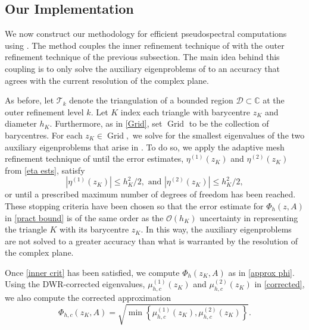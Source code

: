 
\subsection{Our Implementation}

We now construct our methodology for efficient pseudospectral computations using . The method couples the inner refinement technique of  with the outer refinement technique of the previous subsection. The main idea behind this coupling is to only solve the auxiliary eigenproblems of  to an accuracy that agrees with the current resolution of the complex plane.

As before, let $\mathcal{T}_k$ denote the triangulation of a bounded region $\mathcal{D} \subset \mathbb{C}$ at the outer refinement level $k.$ Let $K$ index each triangle with barycentre $z_K$ and diameter $h_K.$ Furthermore, as in \eqref{Grid}, set $\operatorname{Grid}$ to be the collection of barycentres.
For each $z_K \in \operatorname{Grid},$ we solve for the smallest eigenvalues of the two auxiliary eigenproblems that arise in . To do so, we apply the adaptive mesh refinement technique of  until the error estimates, $\eta^{(1)}(z_K)$ and $\eta^{(2)}(z_K)$ from \eqref{eta ests}, satisfy
\begin{equation} \label{inner crit}
    |\eta^{(1)}(z_K)| \le h_K^2/2, \text{ and } |\eta^{(2)}(z_K)| \le h_K^2/2,
\end{equation}
or until a prescribed maximum number of degrees of freedom has been reached. These stopping criteria have been chosen so that the error estimate for $\Phi_h(z, A)$ in \eqref{pract bound} is of the same order as the $\mathcal{O}(h_K)$ uncertainty in representing the triangle $K$ with its barycentre $z_K.$
In this way, the auxiliary eigenproblems are not solved to a greater accuracy than what is warranted by the resolution of the complex plane. 


Once \eqref{inner crit} has been satisfied, we compute $\Phi_h(z_K, A)$ as in \eqref{approx phi}. Using the DWR-corrected eigenvalues, $\mu_{h,c}^{(1)}(z_K)$ and $\mu_{h,c}^{(2)}(z_K)$ in \eqref{corrected}, we also compute the corrected approximation
\begin{equation} \label{phi corr}
    \Phi_{h,c}(z_K, A) = \sqrt{ \min \left\{ \mu_{h,c}^{(1)}(z_K), \mu_{h,c}^{(2)}(z_K) \right\}   }.
\end{equation}


